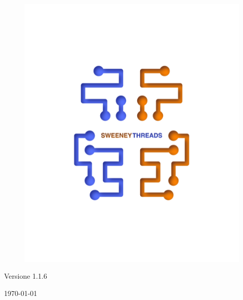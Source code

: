 \documentclass[a4paper]{article}
\begin{document}
\begin{titlepage}
		\begin{figure}[H]
			\centering
			\includegraphics[scale=0.8]{sweeney.png}
		\end{figure}
		\begin{center}
			Versione 1.1.6
		\end{center}
		{\large \today}\\[3cm] 
		\vfill  
	\end{titlepage}
	
	\tableofcontents
	
	\newpage 
\end{document}
